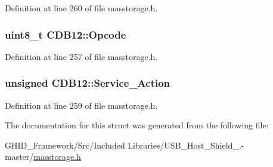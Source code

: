 \-Definition at line 260 of file masstorage.\-h.

\hypertarget{struct_c_d_b12_a75c7fb542c6c0ad6ba4a0e95a49ba1e1}{
\subsubsection[{\-Opcode}]{\setlength{\rightskip}{0pt plus 5cm}uint8\-\_\-t {\bf \-C\-D\-B12\-::\-Opcode}}}\label{struct_c_d_b12_a75c7fb542c6c0ad6ba4a0e95a49ba1e1}


\-Definition at line 257 of file masstorage.\-h.

\hypertarget{struct_c_d_b12_a7d9153a24a41f0432b1467b39d1d5238}{
\subsubsection[{\-Service\-\_\-\-Action}]{\setlength{\rightskip}{0pt plus 5cm}unsigned {\bf \-C\-D\-B12\-::\-Service\-\_\-\-Action}}}\label{struct_c_d_b12_a7d9153a24a41f0432b1467b39d1d5238}


\-Definition at line 259 of file masstorage.\-h.



\-The documentation for this struct was generated from the following file\-:\begin{DoxyCompactItemize}
\item 
\-G\-H\-I\-D\-\_\-\-Framework/\-Src/\-Included Libraries/\-U\-S\-B\-\_\-\-Host\-\_\-\-Shield\-\_.-\/master/\hyperlink{masstorage_8h}{masstorage.\-h}\end{DoxyCompactItemize}
